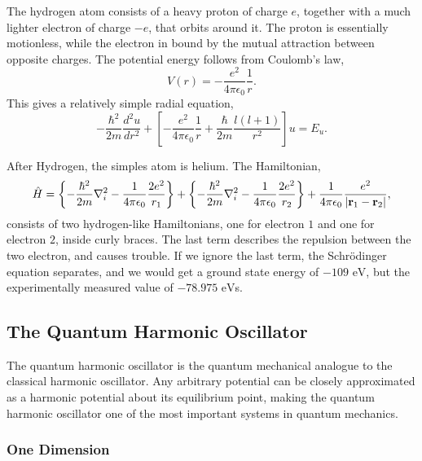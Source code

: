 The hydrogen atom consists of a heavy proton of charge $e$, together 
with a much lighter electron of charge $-e$, that orbits around it. The proton is 
essentially motionless, while the electron 
in bound by the mutual attraction between opposite charges. The potential energy 
follows from Coulomb's law,
\begin{equation}
    V(r) = - \frac{e^2}{4\pi \epsilon_0}\frac{1}{r}.
\end{equation}
This gives a relatively simple radial equation,
\begin{equation}
    -\frac{\hbar^2}{2m}\frac{d^2u}{dr^2}
    + \left[
        - \frac{e^2}{4\pi\epsilon_0}\frac{1}{r} 
        + \frac{\hbar}{2m}\frac{l(l + 1)}{r^2}
    \right]
    u = E_u.
\end{equation}

After Hydrogen, the simples atom is helium. The Hamiltonian,
\begin{equation}
    \hat{H} =
    \left\{
        -\frac{\hbar^2}{2m}\nabla^2_i
        -\frac{1}{4\pi\epsilon_0} \frac{2e^2}{r_1}
    \right\}
    +
    \left\{
        -\frac{\hbar^2}{2m}\nabla^2_i
        -\frac{1}{4\pi\epsilon_0} \frac{2e^2}{r_2}
    \right\}
    +
    \frac{1}{4\pi\epsilon_0}\frac{e^2}{|\vb{r}_1 - \vb{r}_2|},
\end{equation}
consists of two hydrogen-like Hamiltonians, one for electron $1$ and one for 
electron $2$, inside curly braces. The last term describes the repulsion between 
the two electron, and causes trouble. If we ignore the last term, the Schrödinger
equation separates, and we would get a ground state energy of $-109 \text{ eV}$,
but the experimentally measured value of $-78.975 \text{ eV}$s.

\subsection{The Quantum Harmonic Oscillator}

The quantum harmonic oscillator is the quantum mechanical analogue to the 
classical harmonic oscillator. Any arbitrary potential can be closely 
approximated as a harmonic potential about its equilibrium point, making the 
quantum harmonic oscillator one of the most important systems in quantum mechanics.

\subsubsection{One Dimension}

